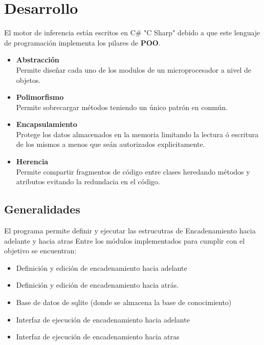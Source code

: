 \documentclass[conference]{IEEEtran}
\begin{document}
\section{Desarrollo}
El motor de inferencia están escritos en C\# "C Sharp" debido a que este lenguaje de programación implementa los pilares de \textbf{POO}.
\begin{itemize}
    \item \textbf{Abstracción}\\ 
    Permite diseñar cada uno de los modulos de un microprocesador a nivel de objetos.
    \item \textbf{Polimorfismo}\\
    Permite sobrecargar métodos teniendo un único patrón en conmún.
    \item \textbf{Encapsulamiento}\\
     Protege los datos almacenados en la memoria limitando la lectura ó escritura de los mismos a menos que seán autorizados explicitamente.
    \item \textbf{Herencia}\\
    Permite compartir fragmentos de código entre clases heredando métodos y atributos evitando la redundacia en el código.
\end{itemize}

\subsection{Generalidades}
El programa permite definir y ejecutar las estrucutras de Encadenamiento hacia adelante y hacia atras
Entre los módulos implementados para cumplir con el objetivo se encuentran:

\begin{itemize}
    \item Definición y edición de encadenamiento hacia adelante
    \item Definición y edición de encadenamiento hacia atrás.
    \item Base de datos de sqlite (donde se almacena la base de conocimiento)
    \item Interfaz de ejecución de encadenamiento hacia adelante
    \item Interfaz de ejecución de encadenamiento hacia atras
\end{itemize}
\end{document}
